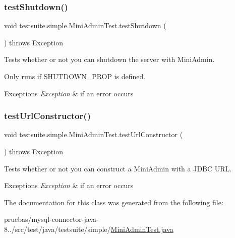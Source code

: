 \subsubsection{\texorpdfstring{test\+Shutdown()}{testShutdown()}}
{\footnotesize\ttfamily void testsuite.\+simple.\+Mini\+Admin\+Test.\+test\+Shutdown (\begin{DoxyParamCaption}{ }\end{DoxyParamCaption}) throws Exception}

Tests whether or not you can shutdown the server with Mini\+Admin.

Only runs if S\+H\+U\+T\+D\+O\+W\+N\+\_\+\+P\+R\+OP is defined.


\begin{DoxyExceptions}{Exceptions}
{\em Exception} & if an error occurs \\
\hline
\end{DoxyExceptions}
\mbox{\label{classtestsuite_1_1simple_1_1_mini_admin_test_ae7432a2cbcda8109289d6240fb07839c}} 
\subsubsection{\texorpdfstring{test\+Url\+Constructor()}{testUrlConstructor()}}
{\footnotesize\ttfamily void testsuite.\+simple.\+Mini\+Admin\+Test.\+test\+Url\+Constructor (\begin{DoxyParamCaption}{ }\end{DoxyParamCaption}) throws Exception}

Tests whether or not you can construct a Mini\+Admin with a J\+D\+BC U\+RL.


\begin{DoxyExceptions}{Exceptions}
{\em Exception} & if an error occurs \\
\hline
\end{DoxyExceptions}


The documentation for this class was generated from the following file\+:\begin{DoxyCompactItemize}
\item 
pruebas/mysql-\/connector-\/java-\/8../src/test/java/testsuite/simple/\mbox{\hyperlink{_mini_admin_test_8java}{Mini\+Admin\+Test.\+java}}\end{DoxyCompactItemize}
